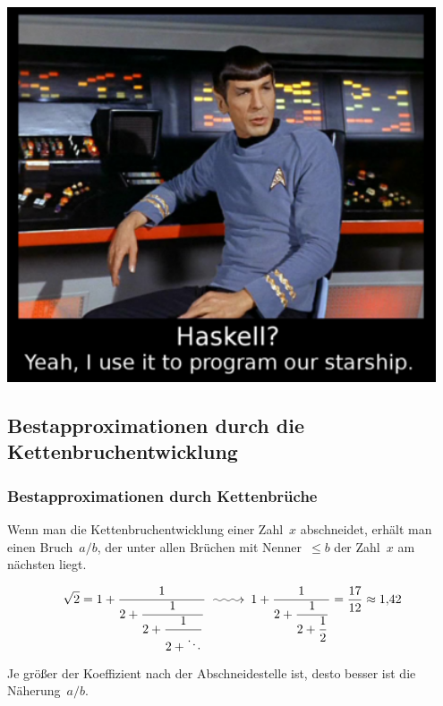 \documentclass[12pt,compress,english,utf8,t]{beamer}
\makeatletter
\newcommand{\longsquiggly}{\xymatrix{{}\ar@{~>}[r]&{}}}
\newcommand{\hil}[1]{{\usebeamercolor[fg]{item}{\textbf{#1}}}}
\newcommand{\icfrac}[4]{#1 + \dfrac{1}{#2 + \dfrac{1}{#3 + \dfrac{1}{#4 + \ddots}}}}
\makeatother
\begin{document}
\begin{frame}[plain]
  \centering
  \includegraphics[width=0.95\textwidth]{haskell-spock}
  \par
\end{frame}


\subsection{Bestapproximationen durch die Kettenbruchentwicklung}

\begin{frame}\frametitle{Bestapproximationen durch Kettenbrüche}
  \begin{theorem}
  Wenn man die Kettenbruchentwicklung einer Zahl~$x$ abschneidet, erhält man
  einen Bruch~$a/b$, der unter allen Brüchen mit Nenner~$\leq b$ der Zahl~$x$
  am nächsten liegt.
  \end{theorem}
  \[
    \sqrt{2} = \icfrac{1}{2}{2}{2} \longsquiggly
    1 + \dfrac{1}{2 + \dfrac{1}{2 + \dfrac{1}{2}}} = \frac{17}{12} \approx 1{,}42
  \]
  \medskip
  \pause

  \hil{Bonus.} Je größer der Koeffizient nach der Abschneidestelle ist, desto
  besser ist die Näherung~$a/b$.
\end{frame}

\end{document}
